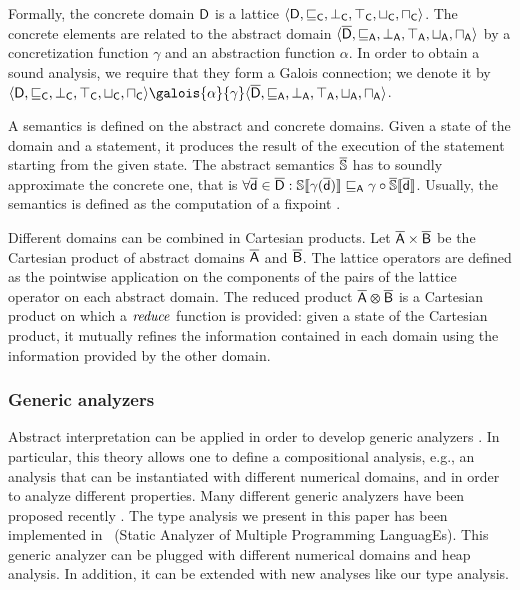 \documentclass{llncs}
\begin{document}
Formally, the concrete domain $\mathsf{D}$ is a lattice $\langle \mathsf{D}, \sqsubseteq_{\mathsf{C}}, \bot_{\mathsf{C}}, \top_{\mathsf{C}}, \sqcup_{\mathsf{C}}, \sqcap_{\mathsf{C}} \rangle$. The concrete elements are related to the abstract domain $\langle \mathsf{\overline{D}}, \sqsubseteq_{\mathsf{A}}, \bot_{\mathsf{A}}, \top_{\mathsf{A}}, \sqcup_{\mathsf{A}}, \sqcap_{\mathsf{A}} \rangle$ by a concretization function $\gamma$ and an abstraction function $\alpha$. In order to obtain a sound analysis, we require that they form a Galois connection; we denote it by  $\langle \cset{D}, \sqsubseteq_\cel{C}, \bot_\cel{C}, \top_\cel{C}, \sqcup_\cel{C}, \sqcap_\cel{C} \rangle \galois{\alpha}{\gamma} \langle \aset{D}, \aorder_\cel{A}, \abot_\cel{A}, \abtop_\cel{A}, \ajoin_\cel{A}, \ameet_\cel{A} \rangle$.

A semantics is defined on the abstract and concrete domains. Given a state of the domain and a statement, it produces the result of the execution of the statement starting from the given state. The abstract semantics $\overline{\mathit{\mathbb{S}}}$ has to soundly approximate the concrete one, that is $\forall \mathsf{\overline{d}} \in \mathsf{\overline{D}} : \mathbb{S}\llbracket \mathtt{\gamma(\mathsf{\overline{d}})} \rrbracket \sqsubseteq_{\mathsf{A}} \gamma \circ \mathbb{\overline{\mathit{\mathbb{S}}}}\llbracket \mathtt{\mathsf{\overline{d}}} \rrbracket$. Usually, the semantics is defined as the computation of a fixpoint \cite{CC79}.

Different domains can be combined in Cartesian products. Let $\mathsf{\overline{A}} \times \mathsf{\overline{B}}$ be the Cartesian product of abstract domains $\mathsf{\overline{A}}$ and $\mathsf{\overline{B}}$. The lattice operators are defined as the pointwise application on the components of the pairs of the lattice operator on each abstract domain. The reduced product $\mathsf{\overline{A}} \varotimes \mathsf{\overline{B}}$ is a Cartesian product on which a $\mathit{reduce}$ function is provided: given a state of the Cartesian product, it mutually refines the information contained in each domain using the information provided by the other domain.
\subsubsection{Generic analyzers}
Abstract interpretation can be applied in order to develop generic analyzers \cite{COU99}. In particular, this theory allows one to define a compositional analysis, e.g., an analysis that can be instantiated with different numerical domains, and in order to analyze different properties. Many different generic analyzers have been proposed recently \cite{FER09a,LF08,SPO05}. The type analysis we present in this paper has been implemented in \analyzer\ (Static Analyzer of Multiple Programming LanguagEs). This generic analyzer can be plugged with different numerical domains and heap analysis. In addition, it can be extended with new analyses like our type analysis.
\end{document}
